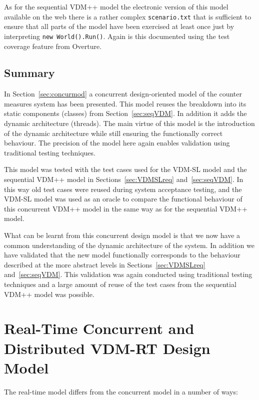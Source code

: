 \documentclass{overturerepchap}
\begin{document}
As for the sequential VDM++ model the electronic
version of this model available on the web there is a rather complex 
\texttt{scenario.txt} that is sufficient to ensure that all parts of the
model have been exercised at least once just by interpreting
\texttt{new World().Run()}. Again is this documented using the
test coverage feature from Overture. 

\subsection{Summary}

In Section~\ref{sec:concurmod} a concurrent design-oriented model of
the counter measures system has been presented. This model reuses the
breakdown into its static components (classes) from
Section~\ref{sec:seqVDM}. In addition it adds the dynamic architecture
(threads). The main virtue of this model is the introduction of the
dynamic architecture while still ensuring the functionally correct
behaviour. The precision of the model here again enables validation
using traditional testing techniques.

This model was tested with the test cases used for the VDM-SL model
and the sequential VDM++ model in Sections~\ref{sec:VDMSLreq}
and~\ref{sec:seqVDM}. In this way old test cases were reused during
system acceptance testing, and the VDM-SL model was used as an oracle
to compare the functional behaviour of this concurrent VDM++ model in
the same way as for the sequential VDM++ model.

What can be learnt from this concurrent design model is
that we now have a common understanding of the dynamic architecture of
the system. In addition we have validated that the new model
functionally corresponds to the behaviour described at the more
abstract levels in Sections~\ref{sec:VDMSLreq}
and~\ref{sec:seqVDM}. This validation was again conducted using
traditional testing techniques and a large amount of reuse of the test
cases from the sequential VDM++ model was possible.

\section{Real-Time Concurrent and Distributed VDM-RT Design Model}\label{sec:realtime}

The real-time model differs from the concurrent model in a number of ways:
\end{document}
